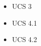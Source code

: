     \begin{itemize}
        \item UCS 3
        \item UCS 4.1
        \item UCS 4.2
    \end{itemize}